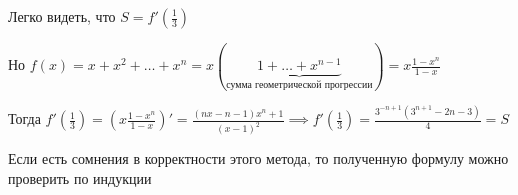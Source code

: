 \documentclass[a4paper]{article}
\begin{document}
\begin{enumerate}
        Легко видеть, что $S = f'\left(\frac{1}{3}\right)$

        Но $f(x) = x + x^2 + \dots + x^n = 
        x(\underbrace{1 + \dots + x^{n - 1}}_\text{сумма геометрической прогрессии}) 
        = x \frac{1 - x^n}{1 - x}$
        
        Тогда $f'\left(\frac{1}{3}\right) 
        = (x \frac{1 - x^n}{1 - x})' 
        = \frac{(nx - n - 1) x^n + 1}{(x - 1)^2} 
        \implies f'\left(\frac{1}{3}\right) = \boxed{\frac{3^{-n + 1} (3^{n + 1} - 2n - 3)}{4} = S}$

        Если есть сомнения в корректности этого метода, то полученную формулу можно проверить по индукции
    \end{enumerate}
\end{document}
